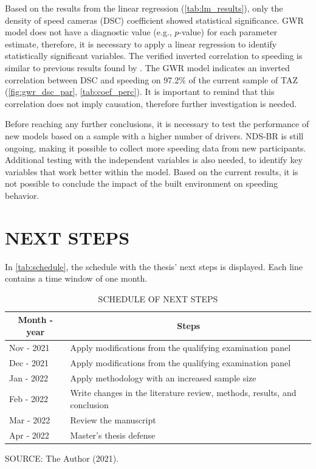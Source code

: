 Based on the results from the linear regression (\autoref{tab:lm_results}), only the density of speed cameras (DSC) coefficient showed statistical significance. GWR model does not have a diagnostic value (e.g., $p$-value) for each parameter estimate, therefore, it is necessary to apply a linear regression to identify statistically significant variables. The verified inverted correlation to speeding is similar to previous results found by \textcite{Li2020,Li2013a,Oliveira2015}. The GWR model indicates an inverted correlation between DSC and speeding on 97.2\% of the current sample of TAZ (\autoref{fig:gwr_dsc_par}, \autoref{tab:coef_perc}). It is important to remind that this correlation does not imply causation, therefore further investigation is needed. 

Before reaching any further conclusions, it is necessary to test the performance of new models based on a sample with a higher number of drivers. NDS-BR is still ongoing, making it possible to collect more speeding data from new participants. Additional testing with the independent variables is also needed, to identify key variables that work better within the model. Based on the current results, it is not possible to conclude the impact of the built environment on speeding behavior.

\section{NEXT STEPS}

In \autoref{tab:schedule}, the schedule with the thesis' next steps is displayed. Each line contains a time window of one month.

\begin{table}[!htbp]
    \footnotesize
    \captionsetup{justification=raggedright,
        singlelinecheck=false,
        font=footnotesize}
    \caption{SCHEDULE OF NEXT STEPS}
    \centering
    \begin{tabular}{ll}
        \hline
        \multicolumn{1}{c}{\textbf{Month - year}} & \multicolumn{1}{c}{\textbf{Steps}} \\
        \hline
        Nov - 2021 & Apply modifications from the qualifying examination panel \\
        Dec - 2021 & Apply modifications from the qualifying examination panel \\
        Jan - 2022 & Apply methodology with an increased sample size           \\
        Feb - 2022 & Write changes in the literature review, methods, results, and conclusion                                                             \\
        Mar - 2022 & Review the manuscript                                     \\
        Apr - 2022 & Master's thesis defense                                   \\
        \hline
    \end{tabular}
    \label{tab:schedule}
    \par \vspace{2mm} \footnotesize \raggedright
    SOURCE: The Author (2021).
\end{table}